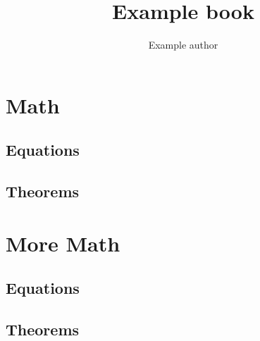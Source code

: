 \documentclass[lang=hu]{math-book}
\title{Example book}
\author{Example author}
\begin{document}
\frontmatter

\begin{titlepage}
	\maketitle
\end{titlepage}

\tableofcontents

\mainmatter

\chapter{Math}

\lipsum[1]

\section{Equations}

\lipsum

\section{Theorems}

\lipsum

\chapter{More Math}

\lipsum[2]

\section{Equations}

\lipsum

\section{Theorems}

\lipsum
\end{document}
